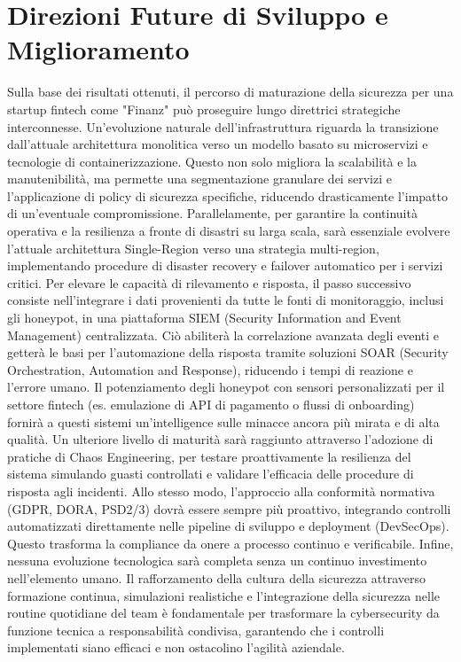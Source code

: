 \section{Direzioni Future di Sviluppo e Miglioramento}
Sulla base dei risultati ottenuti, il percorso di maturazione della sicurezza per una startup fintech come "Finanz" può proseguire lungo direttrici strategiche interconnesse. Un'evoluzione naturale dell'infrastruttura riguarda la transizione dall'attuale architettura monolitica verso un modello basato su microservizi e tecnologie di containerizzazione. Questo non solo migliora la scalabilità e la manutenibilità, ma permette una segmentazione granulare dei servizi e l'applicazione di policy di sicurezza specifiche, riducendo drasticamente l'impatto di un'eventuale compromissione. Parallelamente, per garantire la continuità operativa e la resilienza a fronte di disastri su larga scala, sarà essenziale evolvere l'attuale architettura Single-Region verso una strategia multi-region, implementando procedure di disaster recovery e failover automatico per i servizi critici.
Per elevare le capacità di rilevamento e risposta, il passo successivo consiste nell'integrare i dati provenienti da tutte le fonti di monitoraggio, inclusi gli honeypot, in una piattaforma SIEM (Security Information and Event Management) centralizzata. Ciò abiliterà la correlazione avanzata degli eventi e getterà le basi per l'automazione della risposta tramite soluzioni SOAR (Security Orchestration, Automation and Response), riducendo i tempi di reazione e l'errore umano. Il potenziamento degli honeypot con sensori personalizzati per il settore fintech (es. emulazione di API di pagamento o flussi di onboarding) fornirà a questi sistemi un'intelligence sulle minacce ancora più mirata e di alta qualità.
Un ulteriore livello di maturità sarà raggiunto attraverso l'adozione di pratiche di Chaos Engineering, per testare proattivamente la resilienza del sistema simulando guasti controllati e validare l'efficacia delle procedure di risposta agli incidenti. Allo stesso modo, l'approccio alla conformità normativa (GDPR, DORA, PSD2/3) dovrà essere sempre più proattivo, integrando controlli automatizzati direttamente nelle pipeline di sviluppo e deployment (DevSecOps). Questo trasforma la compliance da onere a processo continuo e verificabile.
Infine, nessuna evoluzione tecnologica sarà completa senza un continuo investimento nell'elemento umano. Il rafforzamento della cultura della sicurezza attraverso formazione continua, simulazioni realistiche e l'integrazione della sicurezza nelle routine quotidiane del team è fondamentale per trasformare la cybersecurity da funzione tecnica a responsabilità condivisa, garantendo che i controlli implementati siano efficaci e non ostacolino l'agilità aziendale.

